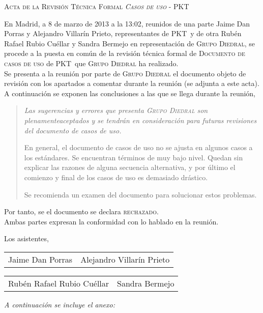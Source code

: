 \documentclass[11pt, a4paper, twoside]{report}
\newcommand*{\PKT}{P\lower2pt\hbox{K}\kern-2pt\raise2pt\hbox{T}\kern-2pt}
\begin{document}
	\begin{center}
		\scshape \large Acta de la Revisión Técnica Formal \textit{Casos de uso} - \PKT\ \vspace{.5cm}
	\end{center}

	En Madrid, a 8 de marzo de 2013 a la 13:02, reunidos de una parte Jaime Dan Porras y Alejandro Villarín Prieto,
representantes de \PKT\ y de otra Rubén Rafael Rubio Cuéllar y Sandra Bermejo	%
en representación de \textsc{Grupo Diedral}, se procede a la puesta en común de la revisión técnica formal de \textsc{Documento de casos de uso} de \PKT\ que \textsc{Grupo Diedral} ha realizado. \\

Se presenta a la reunión por parte de \textsc{Grupo Diedral} el documento objeto de revisión con los apartados a comentar durante la reunión (se adjunta a este acta). \\


A continuación se exponen las conclusiones a las que se llega durante la reunión, 

	\begin{quotation} \itshape
			Las sugerencias y errores que presenta \textsc{Grupo Diedral} son plenamente\break aceptados y
			se tendrán en consideración para futuras revisiones del documento de casos de uso.

			\medskip
			En general, el documento de casos de uso no se ajusta en algunos casos a los estándares. Se encuentran términos de muy bajo nivel.
			Quedan sin explicar las razones de alguna secuencia alternativa, y por último el comienzo y final de los casos de uso es demasiado drástico.

			\medskip
			Se recomienda un examen del documento para solucionar estos problemas.
	\end{quotation}

	Por tanto, se el documento se declara \textsc{rechazado}.\\
	Ambas partes expresan la conformidad con lo hablado en la reunión.

\vspace{2cm}

\raggedright
Los asistentes,

\vspace{2.5cm}

	\begin{tabu} to \linewidth {X[1,c] X[1, c]}
		Jaime Dan Porras & Alejandro Villarín Prieto
	\end{tabu}

	\vfill

	\begin{tabu} to \linewidth {X[1,c] X[1, c]}
		Rubén Rafael Rubio Cuéllar & Sandra Bermejo
	\end{tabu}
	
	\vfill

	{\itshape A continuación se incluye el anexo: }

	
\end{document}
